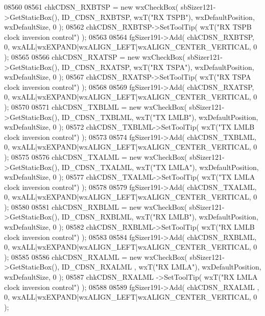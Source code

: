 \begin{DoxyCode}
08560     
08561     chkCDSN_RXBTSP = \textcolor{keyword}{new} wxCheckBox( sbSizer121->GetStaticBox(), ID_CDSN_RXBTSP, wxT(\textcolor{stringliteral}{"RX TSPB"}), 
      wxDefaultPosition, wxDefaultSize, 0 );
08562     chkCDSN_RXBTSP->SetToolTip( wxT(\textcolor{stringliteral}{"RX TSPB clock inversion control"}) );
08563     
08564     fgSizer191->Add( chkCDSN_RXBTSP, 0, wxALL|wxEXPAND|wxALIGN\_LEFT|wxALIGN\_CENTER\_VERTICAL, 0 );
08565     
08566     chkCDSN_RXATSP = \textcolor{keyword}{new} wxCheckBox( sbSizer121->GetStaticBox(), ID_CDSN_RXATSP, wxT(\textcolor{stringliteral}{"RX TSPA"}), 
      wxDefaultPosition, wxDefaultSize, 0 );
08567     chkCDSN_RXATSP->SetToolTip( wxT(\textcolor{stringliteral}{"RX TSPA clock inversion control"}) );
08568     
08569     fgSizer191->Add( chkCDSN_RXATSP, 0, wxALL|wxEXPAND|wxALIGN\_LEFT|wxALIGN\_CENTER\_VERTICAL, 0 );
08570     
08571     chkCDSN_TXBLML = \textcolor{keyword}{new} wxCheckBox( sbSizer121->GetStaticBox(), ID_CDSN_TXBLML, wxT(\textcolor{stringliteral}{"TX LMLB"}), 
      wxDefaultPosition, wxDefaultSize, 0 );
08572     chkCDSN_TXBLML->SetToolTip( wxT(\textcolor{stringliteral}{"TX LMLB clock inversion control"}) );
08573     
08574     fgSizer191->Add( chkCDSN_TXBLML, 0, wxALL|wxEXPAND|wxALIGN\_LEFT|wxALIGN\_CENTER\_VERTICAL, 0 );
08575     
08576     chkCDSN_TXALML = \textcolor{keyword}{new} wxCheckBox( sbSizer121->GetStaticBox(), ID_CDSN_TXALML, wxT(\textcolor{stringliteral}{"TX LMLA"}), 
      wxDefaultPosition, wxDefaultSize, 0 );
08577     chkCDSN_TXALML->SetToolTip( wxT(\textcolor{stringliteral}{"TX LMLA clock inversion control"}) );
08578     
08579     fgSizer191->Add( chkCDSN_TXALML, 0, wxALL|wxEXPAND|wxALIGN\_LEFT|wxALIGN\_CENTER\_VERTICAL, 0 );
08580     
08581     chkCDSN_RXBLML = \textcolor{keyword}{new} wxCheckBox( sbSizer121->GetStaticBox(), ID_CDSN_RXBLML, wxT(\textcolor{stringliteral}{"RX LMLB"}), 
      wxDefaultPosition, wxDefaultSize, 0 );
08582     chkCDSN_RXBLML->SetToolTip( wxT(\textcolor{stringliteral}{"RX LMLB clock inversion control"}) );
08583     
08584     fgSizer191->Add( chkCDSN_RXBLML, 0, wxALL|wxEXPAND|wxALIGN\_LEFT|wxALIGN\_CENTER\_VERTICAL, 0 );
08585     
08586     chkCDSN_RXALML  = \textcolor{keyword}{new} wxCheckBox( sbSizer121->GetStaticBox(), ID_CDSN_RXALML , wxT(\textcolor{stringliteral}{"RX LMLA"}), 
      wxDefaultPosition, wxDefaultSize, 0 );
08587     chkCDSN_RXALML ->SetToolTip( wxT(\textcolor{stringliteral}{"RX LMLA clock inversion control"}) );
08588     
08589     fgSizer191->Add( chkCDSN_RXALML , 0, wxALL|wxEXPAND|wxALIGN\_LEFT|wxALIGN\_CENTER\_VERTICAL, 0 );

\end{DoxyCode}

